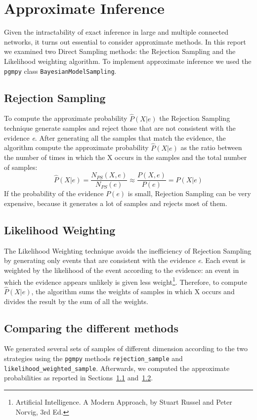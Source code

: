 \documentclass[letterpaper,11pt]{article}
\begin{document}
\section{Approximate Inference}
Given the intractability of exact inference in large and multiple connected networks,
it turns out essential to consider approximate methods. In this report we examined two Direct
Sampling methods: the Rejection Sampling and the Likelihood weighting algorithm. 
To implement approximate inference we used the \texttt{pgmpy} class \texttt{BayesianModelSampling}. 



\subsection{Rejection Sampling}
\label{sec:rs}
To compute the approximate probability $\widehat{P}(X| e)$ the Rejection Sampling technique
generate samples and reject those that are not consistent with the evidence \textit{e}.
After generating all the samples that match the evidence, the algorithm compute the
approximate probability $\widehat{P}(X| e)$ as the ratio between the number of times in which the X occurs
in the samples and the total number of samples:
\[
\widehat{P}(X| e)= \frac{N_{PS}(X, e)}{N_{PS}(e)} \approx \frac{P(X, e)}{P(e)} = P(X| e)
\]
If the probability of the evidence $P(e)$ is small, Rejection Sampling can be very expensive, because it generates a lot of samples and rejects most of them.

\subsection{Likelihood Weighting}
\label{sec:lw}
The Likelihood Weighting technique avoids the inefficiency of Rejection Sampling by generating 
only events that are consistent with the evidence \textit{e}.
Each event is weighted by the likelihood of the event according to the evidence:
an event in which the evidence appears unlikely is given less weight\footnote{Artificial Intelligence. A Modern Approach, by Stuart Russel and Peter
Norvig, 3rd Ed.}. Therefore, to compute $\widehat{P}(X| e)$, the algorithm sums the weights 
of samples in which X occurs and divides the result by the sum of all the weights.

\subsection{Comparing the different methods}
We generated several sets of samples of different dimension according to the two 
 strategies using the \texttt{pgmpy} 
methods \texttt{rejection\_sample} and \texttt{likelihood\_weighted\_sample}. Afterwards, 
we computed the approximate probabilities as reported in Sections~\ref{sec:rs} and~\ref{sec:lw}.\\
\end{document}
